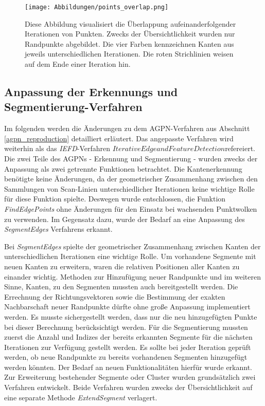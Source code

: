 \begin{figure}[h]
	\texttt{[image: Abbildungen/points\_overlap.png]}
	\centering
	\caption{Diese Abbildung visualisiert die Überlappung aufeinanderfolgender Iterationen von Punkten. Zwecks der Übersichtlichkeit wurden nur Randpunkte abgebildet. Die vier Farben kennzeichnen Kanten aus jeweils unterschiedlichen Iterationen. Die roten Strichlinien weisen auf dem Ende einer Iteration hin.}
	\label{fig: point_overlap}
\end{figure}

\subsection{Anpassung der Erkennungs und Segmentierung-Verfahren}
Im folgenden werden die Änderungen zu dem AGPN-Verfahren aus Abschnitt \ref{agpn_reproduction} detailliert erläutert. Das angepasste Verfahren wird weiterhin als das \textit{IEFD}-Verfahren \textit{\(Iterative Edge and Feature Detection\)}refereiert. Die zwei Teile des AGPNs - Erkennung und Segmentierung - wurden zwecks der Anpassung als zwei getrennte Funktionen betrachtet. Die Kantenerkennung benötigte keine Änderungen, da der geometrischer Zusammenhang zwischen den Sammlungen von Scan-Linien unterschiedlicher Iterationen keine wichtige Rolle für diese Funktion spielte. Deswegen wurde entschlossen, die Funktion \textit{FindEdgePoints} ohne Änderungen für den Einsatz bei wachsenden Punktwolken zu verwenden. Im Gegensatz dazu, wurde der Bedarf an eine Anpassung des \textit{SegmentEdges} Verfahrens erkannt.

Bei \textit{SegmentEdges} spielte der geometrischer Zusammenhang zwischen Kanten der unterschiedlichen Iterationen eine wichtige Rolle. Um vorhandene Segmente mit neuen Kanten zu erweitern, waren die relativen Positionen aller Kanten zu einander wichtig. Methoden zur Hinzufügung neuer Randpunkte und im weiteren Sinne, Kanten, zu den Segmenten mussten auch bereitgestellt werden. Die Errechnung der Richtungsvektoren sowie die Bestimmung der exakten Nachbarschaft neuer Randpunkte dürfte ohne große Anpassung implementiert werden. Es musste sichergestellt werden, dass nur die neu hinzugefügten Punkte bei dieser Berechnung berücksichtigt werden. Für die Segmentierung mussten zuerst die Anzahl und Indizes der bereits erkannten Segmente für die nächsten Iterationen zur Verfügung gestellt werden. Es sollte bei jeder Iteration geprüft werden, ob neue Randpunkte zu bereits vorhandenen Segmenten hinzugefügt werden könnten. Der Bedarf an neuen Funktionalitäten hierfür wurde erkannt. Zur Erweiterung bestehender Segmente oder Cluster wurden grundsätzlich zwei Verfahren entwickelt. Beide Verfahren wurden zwecks der Übersichtlichkeit auf eine separate Methode \textit{ExtendSegment} verlagert.

